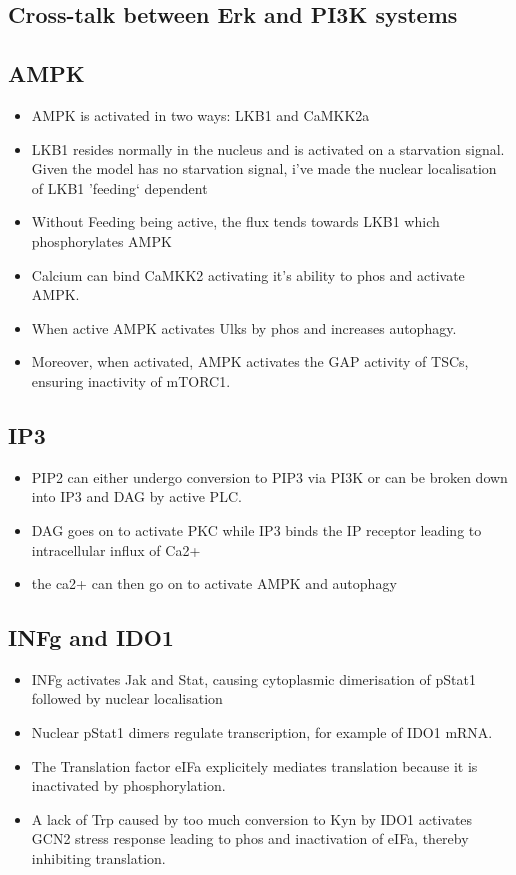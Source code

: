 \documentclass{article}
\begin{document}
    \subsection{Cross-talk between Erk and PI3K systems}

    \subsection{AMPK}
    \begin{itemize}
        \item AMPK is activated in two ways: LKB1 and CaMKK2a
        \item LKB1 resides normally in the nucleus and is activated on a starvation signal. Given the model has no starvation signal, i've made the nuclear localisation of LKB1 'feeding` dependent
        \item Without Feeding being active, the flux tends towards LKB1 which phosphorylates AMPK
        \item Calcium can bind CaMKK2 activating it's ability to phos and activate AMPK.
        \item When active AMPK activates Ulks by phos and increases autophagy.
        \item Moreover, when activated, AMPK activates the GAP activity of TSCs, ensuring inactivity of mTORC1.
    \end{itemize}

    \subsection{IP3}
    \begin{itemize}
        \item PIP2 can either undergo conversion to PIP3 via PI3K or can be broken down into IP3 and DAG by active PLC.
        \item DAG goes on to activate PKC while IP3 binds the IP receptor leading to intracellular influx of Ca2+
        \item the ca2+ can then go on to activate AMPK and autophagy
    \end{itemize}

    \subsection{INFg and IDO1}
    \begin{itemize}
        \item INFg activates Jak and Stat, causing cytoplasmic dimerisation of pStat1 followed by nuclear localisation
        \item Nuclear pStat1 dimers regulate transcription, for example of IDO1 mRNA.
        \item The Translation factor eIFa explicitely mediates translation because it is inactivated by phosphorylation.
        \item A lack of Trp caused by too much conversion to Kyn by IDO1 activates GCN2 stress response leading to phos and inactivation of eIFa, thereby inhibiting translation.
    \end{itemize}
\end{document}
